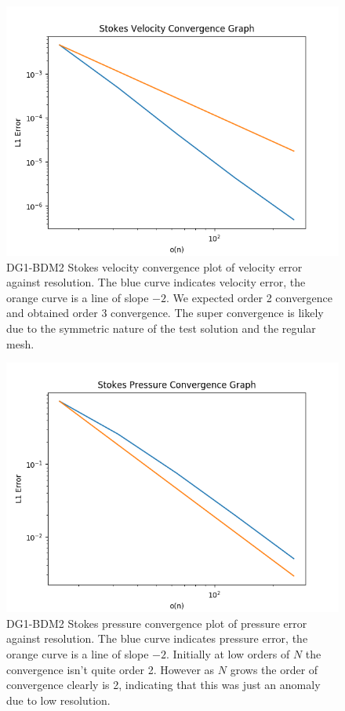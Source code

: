 \documentclass[11pt,twoside,a4paper]{article}
\begin{document}
\begin{figure}
  \includegraphics[width=\linewidth]{stokes_convergence_dbc0.png}
  \caption{DG1-BDM2 Stokes velocity convergence plot of velocity error against resolution. The blue curve indicates velocity error, the orange curve is a line of slope $-2$.  We expected order 2 convergence and obtained order 3 convergence. The super convergence is likely due to the symmetric nature of the test solution and the regular mesh.}
\end{figure}

\begin{figure}
\includegraphics[width=\linewidth]{stokes_pressure_convergence_dbc0.png}
  \caption{DG1-BDM2 Stokes pressure convergence plot of pressure error against resolution. The blue curve indicates pressure error, the orange curve is a line of slope $-2$.  Initially at low orders of $N$ the convergence isn't quite order 2. However as $N$ grows the order of convergence clearly is 2, indicating that this was just an anomaly due to low resolution.}
\end{figure}
\end{document}
